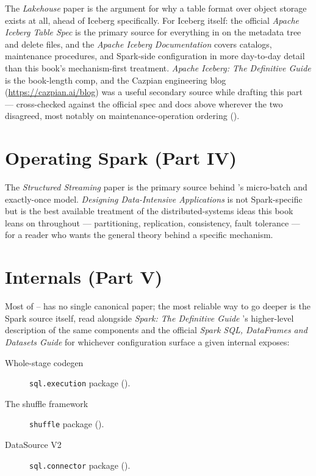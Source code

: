 The \emph{Lakehouse} paper \cite{ArmbrustEtAl2020} is the argument for why a
table format over object storage exists at all, ahead of Iceberg
specifically. For Iceberg itself: the official
\emph{Apache Iceberg Table Spec} \cite{IcebergSpec} is the primary source
for everything in  on the metadata tree and delete
files, and the \emph{Apache Iceberg Documentation} \cite{IcebergDocs} covers
catalogs, maintenance procedures, and Spark-side configuration in more
day-to-day detail than this book's mechanism-first treatment.
\emph{Apache Iceberg: The Definitive Guide} \cite{ShiranEtAl2024} is the
book-length comp, and the Cazpian engineering blog
(\url{https://cazpian.ai/blog}) was a useful secondary source while drafting
this part --- cross-checked against the official spec and docs above
wherever the two disagreed, most notably on maintenance-operation ordering
().

\section*{Operating Spark (Part IV)}

The \emph{Structured Streaming} paper \cite{ArmbrustEtAl2018} is the
primary source behind 's micro-batch and exactly-once
model. \emph{Designing Data-Intensive Applications}
\cite{Kleppmann2017} is not Spark-specific but is the best available
treatment of the distributed-systems ideas this book leans on throughout ---
partitioning, replication, consistency, fault tolerance --- for a reader who
wants the general theory behind a specific mechanism.

\section*{Internals (Part V)}

Most of -- has no single canonical paper;
the most reliable way to go deeper is the Spark source itself, read
alongside \emph{Spark: The Definitive Guide} \cite{ChambersZaharia2018}'s
higher-level description of the same components and the official
\emph{Spark SQL, DataFrames and Datasets Guide} \cite{SparkSQLGuide} for
whichever configuration surface a given internal exposes:

\begin{description}
\item[Whole-stage codegen] \texttt{sql.execution} package
      ().
\item[The shuffle framework] \texttt{shuffle} package ().
\item[DataSource V2] \texttt{sql.connector} package ().
\end{description}
